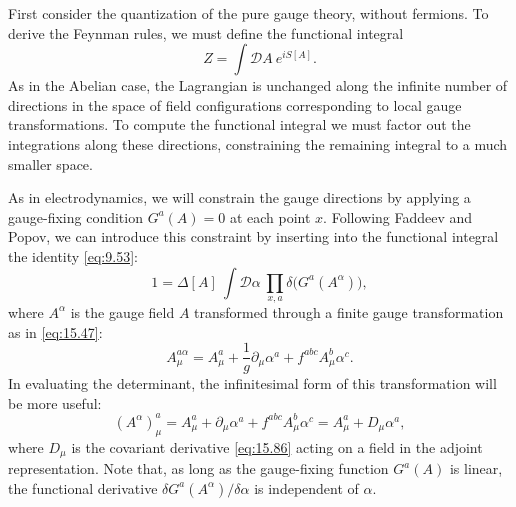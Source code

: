 First consider the quantization of the pure gauge theory, without fermions.
To derive the Feynman rules, we must define the functional integral
\begin{equation}
  Z = \int \mathcal{D}A\ e^{iS[A]} .
  \label{eq:16.22}
\end{equation}
As in the Abelian case, the Lagrangian is unchanged along the infinite number
of directions in the space of field configurations corresponding to local
gauge transformations.  To compute the functional integral we must factor out
the integrations along these directions, constraining the remaining integral
to a much smaller space.

As in electrodynamics, we will constrain the gauge directions by applying a
gauge-fixing condition $G^a(A) = 0$ at each point $x$.  Following Faddeev
and Popov, we can introduce this constraint by inserting into the functional
integral the identity \eqref{eq:9.53}:
\begin{equation}
  1 = \Delta[A]\ \int \mathcal{D}\alpha\ \prod_{x,a} \delta\bigl( G^a(A^\alpha)
    \bigr) ,
  \label{eq:16.23}
\end{equation}
where $A^\alpha$ is the gauge field $A$ transformed through a finite gauge
transformation as in \eqref{eq:15.47}:
\begin{equation}
  A^{a\alpha}_\mu = A^a_\mu + \frac{1}{g}\partial_\mu\alpha^a
    + f^{abc}A^b_\mu\alpha^c .
  \label{eq:16.24}
\end{equation}
In evaluating the determinant, the infinitesimal form of this transformation
will be more useful:
\begin{equation}
  (A^\alpha)^a_\mu = A^a_\mu + \partial_\mu\alpha^a + f^{abc}A^b_\mu\alpha^c
  = A^a_\mu + D_\mu\alpha^a ,
  \label{eq:16.25}
\end{equation}
where $D_\mu$ is the covariant derivative \eqref{eq:15.86} acting on a field
in the adjoint representation.  Note that, as long as the gauge-fixing
function $G^a(A)$ is linear, the functional derivative
$\delta G^a(A^\alpha)/\delta\alpha$ is independent of $\alpha$.

